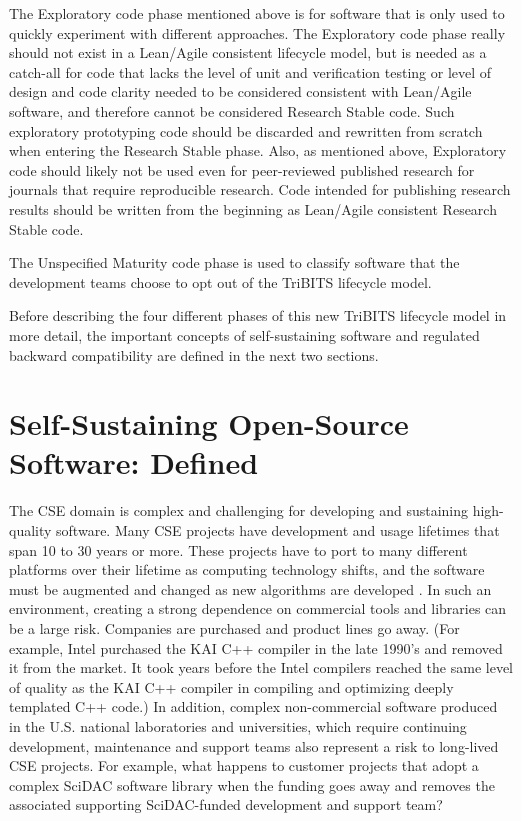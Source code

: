 \documentclass[11pt]{SANDreport}
\begin{document}
The Exploratory code phase mentioned above is for software that is only used to quickly experiment with different approaches.   The Exploratory code phase really should not exist in a Lean/Agile consistent lifecycle model, but is needed as a catch-all for code that lacks the level of unit and verification testing or level of design and code clarity needed to be considered consistent with Lean/Agile software, and therefore cannot be considered Research Stable code.  Such exploratory prototyping code should be discarded and rewritten from scratch when entering the Research Stable phase.  Also, as mentioned above, Exploratory code should likely not be used even for peer-reviewed published research for journals that require reproducible research.  Code intended for publishing research results should be written from the beginning as Lean/Agile consistent Research Stable code.

The Unspecified Maturity code phase is used to classify software that the development teams choose to opt out of the TriBITS lifecycle model.

Before describing the four different phases of this new TriBITS lifecycle model in more detail, the important concepts of self-sustaining software and regulated backward compatibility are defined in the next two sections.


%
{}\section{Self-Sustaining Open-Source Software: Defined}
\label{sec:self_sustaining_open_source_software}
%

The CSE domain is complex and challenging for developing and sustaining high-quality software.  Many CSE projects have development and usage lifetimes that span 10 to 30 years or more.  These projects have to port to many different platforms over their lifetime as computing technology shifts, and the software must be augmented and changed as new algorithms are developed {}\cite{HPCNeedsAToolsStrategy05}.  In such an environment, creating a strong dependence on commercial tools and libraries can be a large risk.  Companies are purchased and product lines go away.  (For example, Intel purchased the KAI C++ compiler in the late 1990's and removed it from the market. It took years before the Intel compilers reached the same level of quality as the KAI C++ compiler in compiling and optimizing deeply templated C++ code.)  In addition, complex non-commercial software produced in the U.S. national laboratories and universities, which require continuing development, maintenance and support teams also represent a risk to long-lived CSE projects.  For example, what happens to customer projects that adopt a complex SciDAC software library when the funding goes away and removes the associated supporting SciDAC-funded development and support team?
\end{document}
